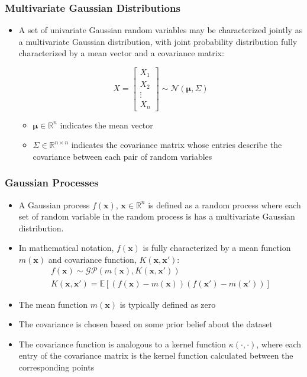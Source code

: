 \documentclass[pdf]{beamer}
\newcommand{\R}{\mathbb{R}}
\newcommand{\E}{\mathbb{E}}
\newcommand{\bx}{\boldsymbol{x}}
\begin{document}
\begin{frame}
  \frametitle{Multivariate Gaussian Distributions}

  \begin{itemize}
    \item A set of univariate Gaussian random variables may be characterized jointly as a multivariate Gaussian
      distribution, with joint probability distribution fully characterized by a mean vector and a covariance matrix:

      \[
        X = \begin{bmatrix}
                 X_{1} \\
                 X_{2} \\
                 \vdots \\
                 X_{n}
               \end{bmatrix}   \sim \mathcal{N}(\boldsymbol{\mu},\Sigma)
      \]
      \begin{itemize}
        \item $\boldsymbol{\mu} \in \R^{n}$ indicates the mean vector
        \item $\Sigma \in \R^{n \times n}$ indicates the covariance matrix whose entries describe the covariance between
          each pair of random variables
      \end{itemize}
  \end{itemize}
\end{frame}

\begin{frame}
  \frametitle{Gaussian Processes}
  \begin{itemize}
    \item A Gaussian process $f(\boldsymbol{x})$, $\bx \in \R^{n}$ is defined as a random process where each set of
      random variable in the random process is has a multivariate Gaussian distribution.
    \item In mathematical notation, $f(\boldsymbol{x})$ is fully characterized by a mean function  $m(\boldsymbol{x})$
      and covariance function, $K(\boldsymbol{x},\boldsymbol{x'})$:
      \begin{gather*}
        f(\boldsymbol{x})\sim\mathcal{GP}(m(\boldsymbol{x}),K(\boldsymbol{x},\boldsymbol{x'})) \\
        K(\bx, \bx') = \E[(f(\bx) - m(\bx))(f(\bx') - m(\bx'))]
      \end{gather*}

    \item The mean function $m(\bx)$ is typically defined as zero
    \item The covariance is chosen based on some prior belief about the dataset
    \item The covariance function is analogous to a kernel function $\kappa(\cdot, \cdot)$, where each entry of the
      covariance matrix is the kernel function calculated between the corresponding points
  \end{itemize}
\end{frame}
\end{document}
